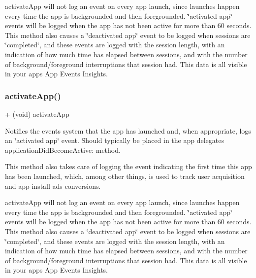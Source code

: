 {\ttfamily activate\+App} will not log an event on every app launch, since launches happen every time the app is backgrounded and then foregrounded. \char`\"{}activated app\char`\"{} events will be logged when the app has not been active for more than 60 seconds. This method also causes a \char`\"{}deactivated app\char`\"{} event to be logged when sessions are \char`\"{}completed\char`\"{}, and these events are logged with the session length, with an indication of how much time has elapsed between sessions, and with the number of background/foreground interruptions that session had. This data is all visible in your app\textquotesingle{}s App Events Insights. \mbox{\label{interfaceFBAppEvents_a440fe60c1685ab36053ba18a190dd82e}} 
\subsubsection{\texorpdfstring{activate\+App()}{activateApp()}\hspace{0.1cm}{\footnotesize\ttfamily [4/5]}}
{\footnotesize\ttfamily + (void) activate\+App \begin{DoxyParamCaption}{ }\end{DoxyParamCaption}}

Notifies the events system that the app has launched and, when appropriate, logs an \char`\"{}activated app\char`\"{} event. Should typically be placed in the app delegates\textquotesingle{} {\ttfamily application\+Did\+Become\+Active\+:} method.

This method also takes care of logging the event indicating the first time this app has been launched, which, among other things, is used to track user acquisition and app install ads conversions.

{\ttfamily activate\+App} will not log an event on every app launch, since launches happen every time the app is backgrounded and then foregrounded. \char`\"{}activated app\char`\"{} events will be logged when the app has not been active for more than 60 seconds. This method also causes a \char`\"{}deactivated app\char`\"{} event to be logged when sessions are \char`\"{}completed\char`\"{}, and these events are logged with the session length, with an indication of how much time has elapsed between sessions, and with the number of background/foreground interruptions that session had. This data is all visible in your app\textquotesingle{}s App Events Insights. \mbox{\label{interfaceFBAppEvents_a440fe60c1685ab36053ba18a190dd82e}} 
